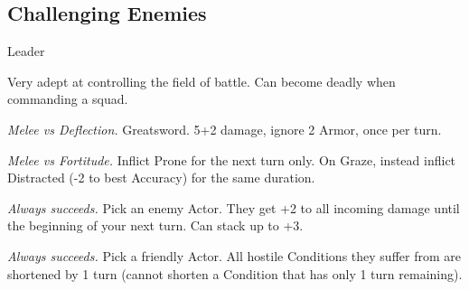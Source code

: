 \newpage
\subsection{Challenging Enemies}




\begin{monsterboxbg}{Leader}

    Very adept at controlling the field of battle. Can become deadly when commanding a squad.
    
    \rpghline
    \stats[
        STR = \stat{15}, 
        DEX = \stat{12},
        CON = \stat{13},
        INT = \stat{12},
        WIS = \stat{8},
        CHA = \stat{14},
    ]
    \rpghline

    \basics[
    armorclass = 2,
    hitpoints  = 24,
    focus      = 6,
    defenses   = {Deflection 3, Reflex 3, Fortitude 3, Will 3}
    ]
    \rpghline

    \details[%
    skills = {Athletics 2, Psychology 2},
    accuracies = {Melee 2, Ranged -2},
    challenge = Veteran,
    ]
    \rpghline%
    

    \begin{rpg-monsteraction}
        \textit{Melee vs Deflection.} Greatsword. 5+2 damage, ignore 2 Armor, once per turn.
    \end{rpg-monsteraction}

    \begin{rpg-monsteraction}
    \end{rpg-monsteraction}

    \begin{rpg-monsteraction}[Brute]
        \textit{Melee vs Fortitude.} Inflict Prone for the next turn only. On Graze, instead inflict Distracted (-2 to best Accuracy) for the same duration.
    \end{rpg-monsteraction}

    \begin{rpg-monsteraction}
        \textit{Always succeeds.} Pick an enemy Actor. They get +2 to all incoming damage until the beginning of your next turn. Can stack up to +3.
    \end{rpg-monsteraction}

    \begin{rpg-monsteraction}
        \textit{Always succeeds.} Pick a friendly Actor. All hostile Conditions they suffer from are shortened by 1 turn (cannot shorten a Condition that has only 1 turn remaining).
    \end{rpg-monsteraction}


\end{monsterboxbg}
